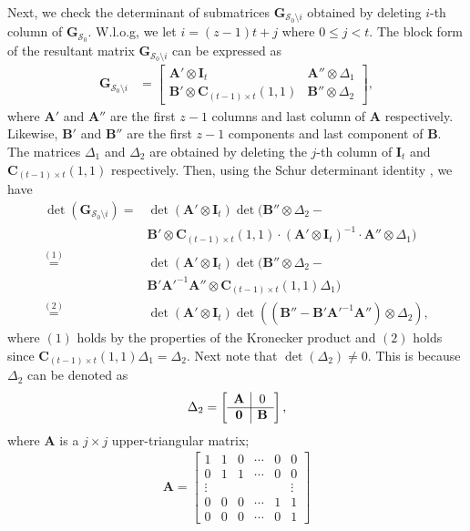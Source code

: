 \documentclass[journal,twocolumn]{IEEEtran}
\theoremstyle{definition}
\newcommand{\calS}{\mathcal{S}}
\newcommand{\bfG}{\mathbf{G}}
\newcommand{\bfI}{\mathbf{I}}
\newcommand{\bfC}{\mathbf{C}}
\newcommand{\bfA}{\mathbf{A}}
\newcommand{\bfB}{\mathbf{B}}
\newcommand{\bfzr}{\mathbf{0}}
\begin{document}
Next, we check the determinant of submatrices $\bfG_{\calS_0\setminus i}$ obtained by deleting $i$-th column of $\bfG_{\calS_0}$. W.l.o.g, we let $i=(z-1)t+j$ where $0 \leq j < t$. The block form of the resultant matrix $\bfG_{\calS_0\setminus i}$ can be expressed as
\begin{align*}	
	\bfG_{\calS_0\setminus i}&=
	\begin{bmatrix}
	\bfA'\otimes \bfI_t&\bfA''\otimes \Delta_1\\
	\bfB'\otimes \bfC_{(t-1)\times t}(1,1)&\bfB''\otimes \Delta_2
	\end{bmatrix},
\end{align*}
where $\bfA'$ and $\bfA''$ are the first $z-1$ columns and last column of $\bfA$ respectively. Likewise, $\bfB'$ and $\bfB''$ are the first $z-1$ components and last component of $\bfB$. The matrices $\Delta_1$ and $\Delta_2$ are obtained by deleting the $j$-th column of $\bfI_t$ and $\bfC_{(t-1)\times t}(1,1)$ respectively. Then, using the Schur determinant identity \cite{hornJ91}, we have
\begin{align*}
\det(\bfG_{\calS_0\setminus i})=&\det(\bfA'\otimes \bfI_t)\det(\bfB''\otimes \Delta_2-\\
&\bfB'\otimes \bfC_{(t-1)\times t}(1,1)\cdot (\bfA'\otimes \bfI_t)^{-1}\cdot \bfA''\otimes\Delta_1)\\
\overset{(1)}{=}&\det(\bfA'\otimes \bfI_t)\det(\bfB''\otimes \Delta_2-\\
&\bfB'\bfA'^{-1}\bfA''\otimes \bfC_{(t-1)\times t}(1,1)\Delta_1)\\
\overset{(2)}{=}&\det(\bfA'\otimes \bfI_t)\det((\bfB''-\bfB'\bfA'^{-1}\bfA'')\otimes \Delta_2),
\end{align*}
where $(1)$ holds by the properties of the Kronecker product \cite{hornJ91} and $(2)$ holds since $ \bfC_{(t-1)\times t}(1,1)\Delta_1=\Delta_2$. Next note that $\det(\Delta_2) \neq 0$. This is because $\Delta_2$ can be denoted as
	\begin{align*}
\Delta_2=
\left[
\begin{array}{c|c}
\mathbf A&\mathbf \bfzr\\  \hline
\bfzr&\mathbf B
\end{array}
\right],
\end{align*}
where $\bfA$ is a $j\times j$ upper-triangular matrix;
\begin{align*}
\bfA=\begin{bmatrix}
1&1&0&\cdots&0&0\\
0&1&1&\cdots&0&0\\
\vdots&&&&&\vdots\\
0&0&0&\cdots&1&1\\
0&0&0&\cdots&0&1
\end{bmatrix}
\end{align*}
\end{document}

